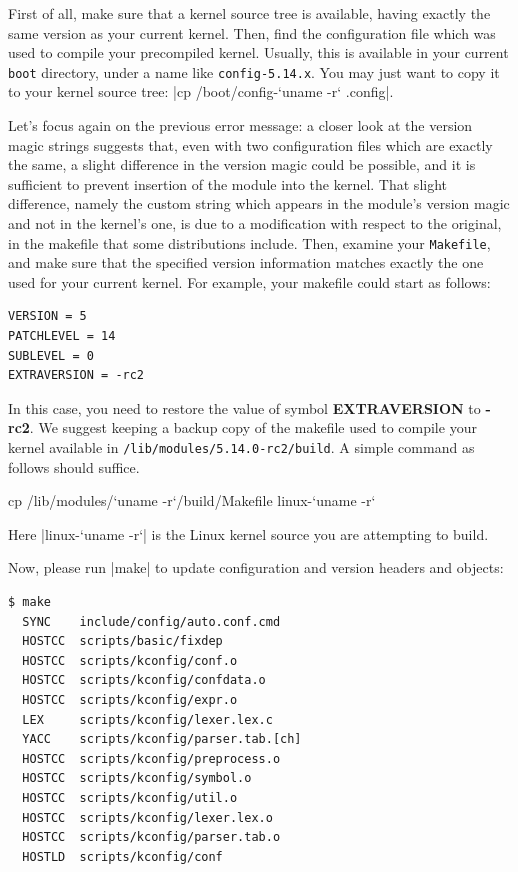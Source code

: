 \documentclass[10pt, oneside]{book}
\begin{document}
First of all, make sure that a kernel source tree is available, having exactly the same version as your current kernel.
Then, find the configuration file which was used to compile your precompiled kernel.
Usually, this is available in your current \verb|boot| directory, under a name like \verb|config-5.14.x|.
You may just want to copy it to your kernel source tree: \sh|cp /boot/config-`uname -r` .config|.

Let's focus again on the previous error message: a closer look at the version magic strings suggests that, even with two configuration files which are exactly the same, a slight difference in the version magic could be possible, and it is sufficient to prevent insertion of the module into the kernel.
That slight difference, namely the custom string which appears in the module's version magic and not in the kernel's one, is due to a modification with respect to the original, in the makefile that some distributions include.
Then, examine your \verb|Makefile|, and make sure that the specified version information matches exactly the one used for your current kernel.
For example, your makefile could start as follows:

\begin{verbatim}
VERSION = 5
PATCHLEVEL = 14
SUBLEVEL = 0
EXTRAVERSION = -rc2
\end{verbatim}

In this case, you need to restore the value of symbol \textbf{EXTRAVERSION} to \textbf{-rc2}.
We suggest keeping a backup copy of the makefile used to compile your kernel available in \verb|/lib/modules/5.14.0-rc2/build|.
A simple command as follows should suffice.
\begin{codebash}
cp /lib/modules/`uname -r`/build/Makefile linux-`uname -r`
\end{codebash}
Here \sh|linux-`uname -r`| is the Linux kernel source you are attempting to build.

Now, please run \sh|make| to update configuration and version headers and objects:

\begin{verbatim}
$ make
  SYNC    include/config/auto.conf.cmd
  HOSTCC  scripts/basic/fixdep
  HOSTCC  scripts/kconfig/conf.o
  HOSTCC  scripts/kconfig/confdata.o
  HOSTCC  scripts/kconfig/expr.o
  LEX     scripts/kconfig/lexer.lex.c
  YACC    scripts/kconfig/parser.tab.[ch]
  HOSTCC  scripts/kconfig/preprocess.o
  HOSTCC  scripts/kconfig/symbol.o
  HOSTCC  scripts/kconfig/util.o
  HOSTCC  scripts/kconfig/lexer.lex.o
  HOSTCC  scripts/kconfig/parser.tab.o
  HOSTLD  scripts/kconfig/conf
\end{verbatim}
\end{document}
